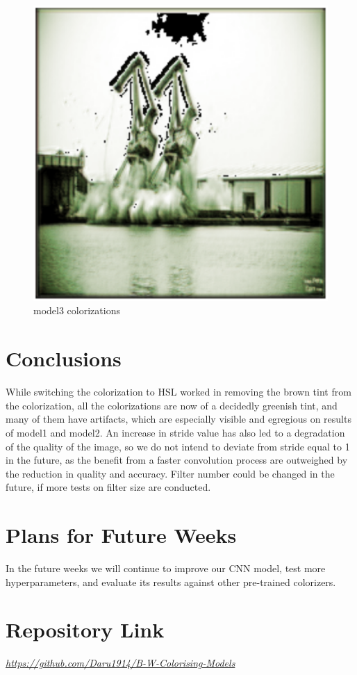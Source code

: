 \documentclass[]{article}
\begin{document}
\begin{figure}[H]
		\includegraphics[scale=0.35]{m3_3.png}
		\caption{model3 colorizations}
	\end{figure}
	
	\section{Conclusions}
	While switching the colorization to HSL worked in removing the brown tint from the colorization, all the colorizations are now of a decidedly greenish tint, and many of them have artifacts, which are especially visible and egregious on results of model1 and model2. An increase in stride value has also led to a degradation of the quality of the image, so we do not intend to deviate from stride equal to 1 in the future, as the benefit from a faster convolution process are outweighed by the reduction in quality and accuracy. Filter number could be changed in the future, if more tests on filter size are conducted.
	
	\section{Plans for Future Weeks}
	In the future weeks we will continue to improve our CNN model, test more hyperparameters, and evaluate its results against other pre-trained colorizers.
	
	\section{Repository Link}
	\href{https://github.com/Daru1914/B-W-Colorising-Models}{\emph{https://github.com/Daru1914/B-W-Colorising-Models}}
	
\end{document}
